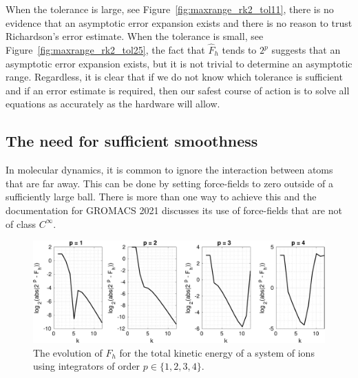 \documentclass[runningheads]{llncs}
\begin{document}
When the tolerance is large, see Figure~\ref{fig:maxrange_rk2_tol11}, there is no evidence that an asymptotic error expansion exists and there is no reason to trust Richardson's error estimate. When the tolerance is small, see Figure~\ref{fig:maxrange_rk2_tol25}, the fact that $\hat{F}_h$ tends to $2^p$ suggests that an asymptotic error expansion exists, but it is not trivial to determine an asymptotic range. Regardless, it is clear that if we do not know which tolerance is sufficient and if an error estimate is required, then our safest course of action is to solve all equations as accurately as the hardware will allow.

\subsection{The need for sufficient smoothness}

In molecular dynamics, it is common to ignore the interaction between atoms that are far away. This can be done by setting force-fields to zero outside of a sufficiently large ball. There is more than one way to achieve this and the documentation for GROMACS 2021 discusses its use of force-fields that are not of class $C^{\infty}$.

\begin{figure}[h!]
  \centering
  \includegraphics[width=\linewidth]{iontrap_mwe1.pdf}
  \caption{The evolution of $F_h$ for the total kinetic energy of a system of ions using integrators of order $p \in \{1,2,3,4\}$.}
  \label{fig:iontrap_mwe1}
\end{figure}
\end{document}

